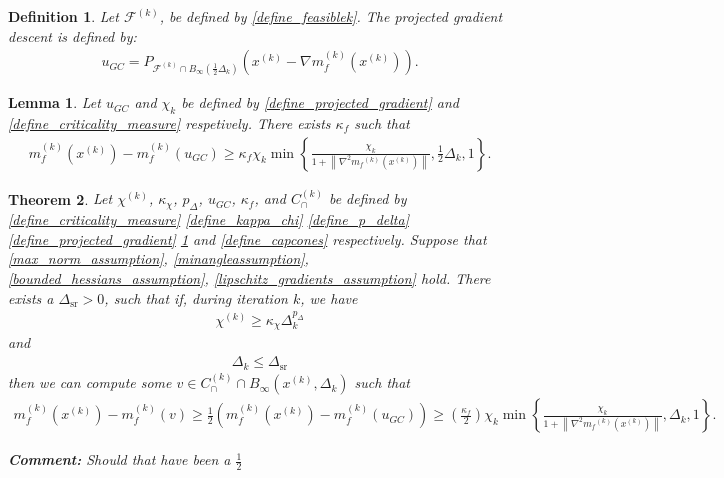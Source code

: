 \documentclass{article}
\newenvironment{comment}
  {\par\medskip
   \color{red}%
   \begin{framed}
   \textbf{Comment: }\ignorespaces}
 {\end{framed}
  \medskip}
\newtheorem{theorem}{Theorem}[section]
\newtheorem{definition}{Definition}[theorem]
\newtheorem{lemma}[theorem]{Lemma}
\theoremstyle{case}
\numberwithin{theorem}{subsection}
\newcommand{\capcones}{{C^{(k)}_{\cap}}}
\newcommand{\chik}{{\chi^{(k)}}}
\newcommand{\dk}{\Delta_k}
\newcommand{\dsr}{{\Delta_{\textrm{sr}}}}
\newcommand{\feasiblek}{{\mathcal F^{(k)}}}
\newcommand{\gk}{{\nabla m_f^{(k)}(x^{(k)})}}
\newcommand{\mfk}{{{m}_f}^{(k)}}
\newcommand{\tr}{{ B_{\infty}\left(\xk, \dk\right) }}
\newcommand{\xk}{{x^{(k)}}}
\begin{document}
\begin{definition}
Let $\feasiblek$, be defined by \cref{define_feasiblek}.
The projected gradient descent is defined by:
\begin{align}
u_{GC} = P_{\feasiblek\cap B_{\infty}\left(\frac 1 2 \dk\right)}\left(\xk-\gk\right) \label{define_projected_gradient}.
\end{align}
\end{definition}

\begin{lemma}
\label{sufficient_reduction_of_projected_gradient}
Let 
$u_{GC}$ and $\chi_k$
be defined by
\cref{define_projected_gradient} and \cref{define_criticality_measure}
respetively.
There exists $\kappa_{f}$ such that
\begin{align*}
m_f^{(k)}(\xk) - m_f^{(k)}(u_{GC}) \ge \kappa_f\chi_k \min\left\{ \frac{\chi_k}{1+\left\|\nabla^2 \mfk(\xk)\right\|}, \frac 1 2 \dk, 1 \right\}.
\end{align*}
\end{lemma}




\begin{theorem}
\label{sufficient_reduction_theorem}
Let 
$\chik$,
$\kappa_{\chi}$,
$p_{\Delta}$,
$u_{GC}$,
$\kappa_f$,
and $\capcones$
be defined by
\cref{define_criticality_measure}
\cref{define_kappa_chi}
\cref{define_p_delta}
\cref{define_projected_gradient}
\cref{sufficient_reduction_of_projected_gradient}
and \cref{define_capcones}
respectively.
Suppose that
\cref{max_norm_assumption},
\cref{minangleassumption},
\cref{bounded_hessians_assumption},
\cref{lipschitz_gradients_assumption}
hold.
There exists a $\dsr > 0$, such that if, during iteration $k$, we have
\begin{align}
\chik \ge \kappa_{\chi} \dk^{p_{\Delta}} \label{sr_chi_big_enough}
\end{align}
and
\begin{align}
\dk \le \dsr \label{sr_delta_small_enough}
\end{align}
then we can compute some $v \in \capcones \cap \tr$ such that
\begin{align*}
m_f^{(k)}(\xk) - m_f^{(k)}(v) \ge \frac 1 2 \left(m_f^{(k)}(\xk) - m_f^{(k)}(u_{GC})\right) \ge \left(\frac{\kappa_f}{2} \right)\chi_k \min\left\{ \frac{\chi_k}{1+\left\|\nabla^2 \mfk(\xk)\right\|}, \dk, 1 \right\}.
\end{align*}

\begin{comment}
Should that have been a $\frac 1 2$
\end{comment}

\end{theorem}
\end{document}
